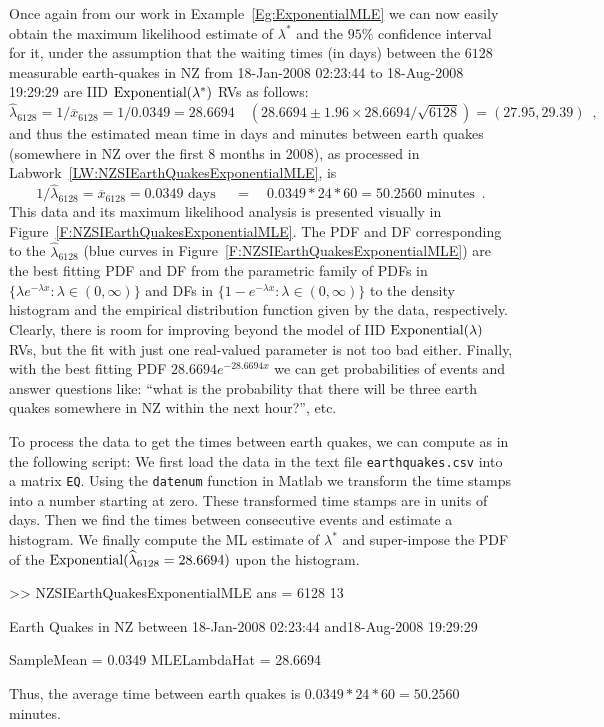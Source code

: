 \begin{example}\label{EX:NZSIEarthQuakesExponentialMLE}  
Once again from our work in Example~\ref{Eg:ExponentialMLE} we can now easily obtain the maximum likelihood estimate of $\lambda^*$ and the $95\%$ confidence interval for it, under the assumption that the waiting times (in days) between the $6128$ measurable earth-quakes in NZ from 18-Jan-2008 02:23:44 to 18-Aug-2008 19:29:29 are IID $\mbox{{\rm Exponential}}(\lambda^*)$ RVs as follows: 
$$\widehat{\lambda}_{6128}=1/\overline{x}_{6128}=1/0.0349=28.6694 \quad 
(28.6694 \pm 1.96 \times 28.6694/\sqrt{6128}) = (27.95,29.39) \enspace ,$$ 
and thus the estimated mean time in days and minutes between earth quakes (somewhere in NZ over the first 8 months in 2008), as processed in Labwork~\ref{LW:NZSIEarthQuakesExponentialMLE}, is 
$$1/\widehat{\lambda}_{6128}=\overline{x}_{6128}=0.0349 \text{ days } \quad = \quad 0.0349*24*60=50.2560  \text{ minutes} \enspace .$$  
This data and its maximum likelihood analysis is presented visually in Figure~\ref{F:NZSIEarthQuakesExponentialMLE}.  The PDF and DF corresponding to the $\widehat{\lambda}_{6128}$ (blue curves in Figure~\ref{F:NZSIEarthQuakesExponentialMLE}) are the best fitting PDF and DF from the parametric family of PDFs in $\{\lambda e^{-\lambda x}: \lambda \in (0,\infty) \}$ and DFs in $\{1- e^{-\lambda x}: \lambda \in (0,\infty) \}$ to the density histogram and the empirical distribution function given by the data, respectively.  Clearly, there is room for improving beyond the model of IID $\mbox{{\rm Exponential}}(\lambda)$ RVs, but the fit with just one real-valued parameter is not too bad either.  Finally, with the best fitting PDF $28.6694 e^{-28.6694 x}$ we can get probabilities of events and answer questions like: ``what is the probability that there will be three earth quakes somewhere in NZ within the next hour?'', etc.
\end{example}

\begin{labwork}\label{LW:NZSIEarthQuakesExponentialMLE}
To process the data to get the times between earth quakes, we can compute as in the following script:
We first load the data in the text file {\tt earthquakes.csv} into a matrix {\tt EQ}.  Using the {\tt datenum} function in {\sc Matlab} we transform the time stamps into a number starting at zero.  These transformed time stamps are in units of days.  Then we find the times between consecutive events and estimate a histogram.  We finally compute the ML estimate of $\lambda^*$ and super-impose the PDF of the $\mbox{{\rm Exponential}}(\widehat{\lambda}_{6128}= 28.6694)$ upon the histogram.
\begin{VrbM}
>> NZSIEarthQuakesExponentialMLE
ans =        6128          13

Earth Quakes in NZ between
18-Jan-2008 02:23:44 and18-Aug-2008 19:29:29

SampleMean =    0.0349
MLELambdaHat =   28.6694
\end{VrbM}
Thus, the average time between earth quakes is $0.0349*24*60=50.2560$ minutes.
\end{labwork}

